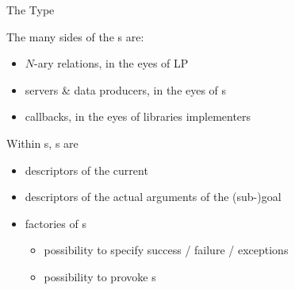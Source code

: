 \documentclass[handout]{beamer}
\begin{document}
\begin{frame}[allowframebreaks]{The  Type}
    \framebreak



    \framebreak

    \begin{block}{The many sides of the s}
         are:
        \begin{itemize}
            \item $N$-ary relations, in the eyes of LP
            \item servers \& data producers, in the eyes of s
            \item callbacks, in the eyes of libraries implementers
        \end{itemize}
    \end{block}

    \framebreak

    \begin{block}{Within s, s are}
        \begin{itemize}
            \item descriptors of the \alert{current} 
            \item descriptors of the \alert{actual} arguments of the (sub-)goal
            \item factories of s
            \begin{itemize}
                \item possibility to specify \alert{success} / \alert{failure} / \alert{exceptions}
                \item possibility to provoke \alert{}s
            \end{itemize}
        \end{itemize}
    \end{block}
\end{frame}
\end{document}
